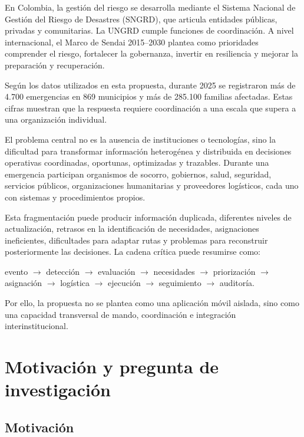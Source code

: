 \documentclass[11pt,a4paper]{article}
\begin{document}
En Colombia, la gestión del riesgo se desarrolla mediante el Sistema Nacional
de Gestión del Riesgo de Desastres (SNGRD), que articula entidades públicas,
privadas y comunitarias. La UNGRD cumple funciones de coordinación. A nivel
internacional, el Marco de Sendai 2015--2030 plantea como prioridades
comprender el riesgo, fortalecer la gobernanza, invertir en resiliencia y
mejorar la preparación y recuperación.

Según los datos utilizados en esta propuesta, durante 2025 se registraron más
de 4.700 emergencias en 869 municipios y más de 285.100 familias afectadas.
Estas cifras muestran que la respuesta requiere coordinación a una escala que
supera a una organización individual.

El problema central no es la ausencia de instituciones o tecnologías, sino la
dificultad para transformar información heterogénea y distribuida en
decisiones operativas coordinadas, oportunas, optimizadas y trazables. Durante
una emergencia participan organismos de socorro, gobiernos, salud, seguridad,
servicios públicos, organizaciones humanitarias y proveedores logísticos, cada
uno con sistemas y procedimientos propios.

Esta fragmentación puede producir información duplicada, diferentes niveles de
actualización, retrasos en la identificación de necesidades, asignaciones
ineficientes, dificultades para adaptar rutas y problemas para reconstruir
posteriormente las decisiones. La cadena crítica puede resumirse como:

\begin{center}
evento $\rightarrow$ detección $\rightarrow$ evaluación $\rightarrow$
necesidades $\rightarrow$ priorización $\rightarrow$ asignación $\rightarrow$
logística $\rightarrow$ ejecución $\rightarrow$ seguimiento $\rightarrow$
auditoría.
\end{center}

Por ello, la propuesta no se plantea como una aplicación móvil aislada, sino
como una capacidad transversal de mando, coordinación e integración
interinstitucional.

\section{Motivación y pregunta de investigación}

\subsection{Motivación}
\end{document}
